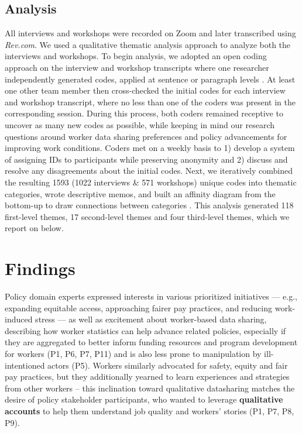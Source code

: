 \subsection{Analysis}\label{h.yglm2551dqq7} All interviews and workshops were recorded on Zoom and later transcribed using \emph{Rev.com}. We used a qualitative thematic analysis approach \cite{WMCa} to analyze both the interviews and workshops. To begin analysis, we adopted an open coding approach on the interview and workshop transcripts where one researcher independently generated codes, applied at sentence or paragraph levels \cite{C5bR,mcdonald2019reliability,WMCa,CQOi,T92p}. At least one other team member then cross-checked the initial codes for each interview and workshop transcript, where no less than one of the coders was present in the corresponding session. During this process, both coders remained receptive to uncover as many new codes as possible, while keeping in mind our research questions around worker data sharing preferences and policy advancements for improving work conditions. Coders met on a weekly basis to 1) develop a system of assigning IDs to participants while preserving anonymity and 2) discuss and resolve any disagreements about the initial codes. Next, we iteratively combined the resulting 1593 (1022 interviews \& 571 workshops) unique codes into thematic categories, wrote descriptive memos, and built an affinity diagram from the bottom-up to draw connections between categories \cite{uTeY,sQQh}. This analysis generated 118 first-level themes, 17 second-level themes{ and} four third-level themes, which we report on {below}.


\section{Findings}

{Policy domain experts expressed interests in various prioritized initiatives --- e.g., expanding equitable access, approaching fairer pay practices, and reducing work-induced stress --- as well as excitement about worker-based data sharing, describing how worker statistics can help advance related policies, especially if they are aggregated to better inform funding resources and program development for workers (P1, P6, P7, P11) and is also less prone to manipulation by ill-intentioned actors (P5). Workers similarly advocated for safety, equity and fair pay practices, but they additionally yearned to learn experiences and strategies from other workers -- this inclination toward qualitative datasharing matches the desire of policy stakeholder participants, who
wanted to leverage \textbf{qualitative accounts} to help them understand job quality and workers' stories (P1, P7, P8, P9). }


